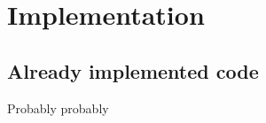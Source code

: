 
\chapter{Implementation}
\label{ch:implementation}

\section{Already implemented code}

Probably probably